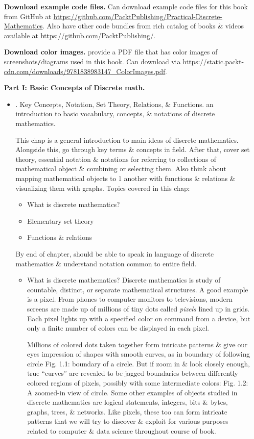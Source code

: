 \documentclass{article}
\begin{document}
\begin{enumerate}
	{\bf Download example code files.} Can download example code files for this book from GitHub at \url{https://github.com/PacktPublishing/Practical-Discrete-Mathematics}. Also have other code bundles from rich catalog of books \& videos available at \url{https://github.com/PacktPublishing/}.
	
	{\bf Download color images.} provide a PDF file that has color images of screenshots{\tt/}diagrams used in this book. Can download via \url{https://static.packt-cdn.com/downloads/9781838983147_ColorImages.pdf}.	
	
	{\bf Part I: Basic Concepts of Discrete math.}
	\begin{itemize}
		\item {. Key Concepts, Notation, Set Theory, Relations, \& Functions.} an introduction to basic vocabulary, concepts, \& notations of discrete mathematics.
		
		This chap is a general introduction to main ideas of discrete mathematics. Alongside this, go through key terms \& concepts in field. After that, cover set theory, essential notation \& notations for referring to collections of mathematical object \& combining or selecting them. Also think about mapping mathematical objects to 1 another with functions \& relations \& visualizing them with graphs. Topics covered in this chap:
		\begin{itemize}
			\item What is discrete mathematics?
			\item Elementary set theory
			\item Functions \& relations
		\end{itemize}
		By end of chapter, should be able to speak in language of discrete mathematics \& understand notation common to entire field.
		\begin{itemize}
			\item {\sf What is discrete mathematics?} Discrete mathematics is study of countable, distinct, or separate mathematical structures. A good example is a pixel. From phones to computer monitors to televisions, modern screens are made up of millions of tiny dots called {\it pixels} lined up in grids. Each pixel lights up with a specified color on command from a device, but only a finite number of colors can be displayed in each pixel.
			
			Millions of colored dots taken together form intricate patterns \& give our eyes impression of shapes with smooth curves, as in boundary of following circle {\sf Fig. 1.1: boundary of a circle}. But if zoom in \& look closely enough, true ``curves'' are revealed to be jagged boundaries between differently colored regions of pixels, possibly with some intermediate colors: {\sf Fig. 1.2: A zoomed-in view of circle}. Some other examples of objects studied in discrete mathematics are logical statements, integers, bits \& bytes, graphs, trees, \& networks. Like pixels, these too can form intricate patterns that we will try to discover \& exploit for various purposes related to computer \& data science throughout course of book.
			

\end{itemize}
\end{itemize}
\end{enumerate}
\end{document}
